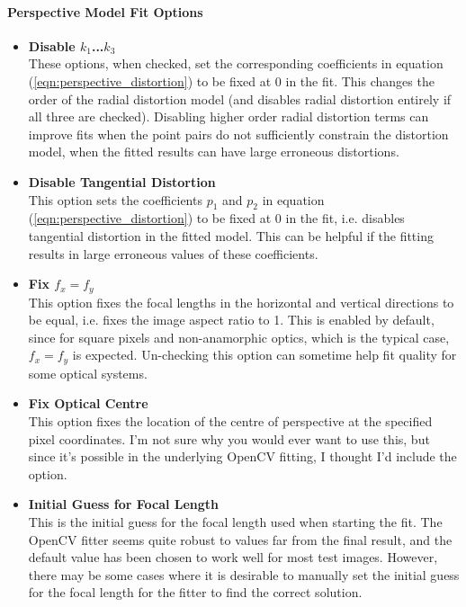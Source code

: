 \documentclass[12pt]{article}
\begin{document}
\paragraph{Perspective Model Fit Options}

\begin{itemize}
\item{\textbf{Disable $k_1$...$k_3$}\\These options, when checked, set the corresponding coefficients in equation (\ref{eqn:perspective_distortion}) to be fixed at 0 in the fit. This changes the order of the radial distortion model (and disables radial distortion entirely if all three are checked). Disabling higher order radial distortion terms can improve fits when the point pairs do not sufficiently constrain the distortion model, when the fitted results can have large erroneous distortions.}
\item{\textbf{Disable Tangential Distortion}\\This option sets the coefficients $p_1$ and $p_2$ in equation (\ref{eqn:perspective_distortion}) to be fixed at 0 in the fit, i.e. disables tangential distortion in the fitted model. This can be helpful if the fitting results in large erroneous values of these coefficients.}
\item{\textbf{Fix $f_x = f_y$}\\This option fixes the focal lengths in the horizontal and vertical directions to be equal, i.e. fixes the image aspect ratio to 1. This is enabled by default, since for square pixels and non-anamorphic optics, which is the typical case, $f_x = f_y$ is expected. Un-checking this option can sometime help fit quality for some optical systems.}
\item{\textbf{Fix Optical Centre}\\This option fixes the location of the centre of perspective at the specified pixel coordinates. I'm not sure why you would ever want to use this, but since it's possible in the underlying OpenCV fitting, I thought I'd include the option.}
\item{\textbf{Initial Guess for Focal Length}\\This is the initial guess for the focal length used when starting the fit. The OpenCV fitter seems quite robust to values far from the final result, and the default value has been chosen to work well for most test images. However, there may be some cases where it is desirable to manually set the initial guess for the focal length for the fitter to find the correct solution.}
\end{itemize}
\end{document}
